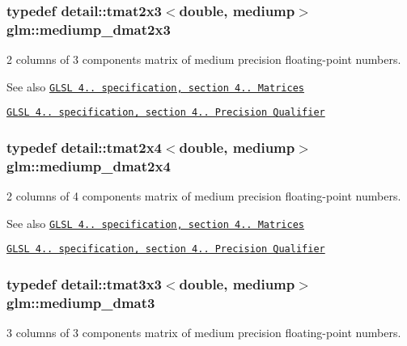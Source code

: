 \subsubsection[{\texorpdfstring{mediump\+\_\+dmat2x3}{mediump_dmat2x3}}]{\setlength{\rightskip}{0pt plus 5cm}typedef detail\+::tmat2x3$<$double, mediump$>$ {\bf glm\+::mediump\+\_\+dmat2x3}}\hypertarget{group__core__precision_ga734e988edf759c7012c443014acb6674}{}\label{group__core__precision_ga734e988edf759c7012c443014acb6674}
2 columns of 3 components matrix of medium precision floating-\/point numbers.

\begin{DoxySeeAlso}{See also}
\href{http://www.opengl.org/registry/doc/GLSLangSpec.4.20.8.pdf}{\tt G\+L\+SL 4.. specification, section 4.. Matrices} 

\href{http://www.opengl.org/registry/doc/GLSLangSpec.4.20.8.pdf}{\tt G\+L\+SL 4.. specification, section 4.. Precision Qualifier} 
\end{DoxySeeAlso}
\subsubsection[{\texorpdfstring{mediump\+\_\+dmat2x4}{mediump_dmat2x4}}]{\setlength{\rightskip}{0pt plus 5cm}typedef detail\+::tmat2x4$<$double, mediump$>$ {\bf glm\+::mediump\+\_\+dmat2x4}}\hypertarget{group__core__precision_gadb60bf60ef2b8da4a28a372b2bcca3a3}{}\label{group__core__precision_gadb60bf60ef2b8da4a28a372b2bcca3a3}
2 columns of 4 components matrix of medium precision floating-\/point numbers.

\begin{DoxySeeAlso}{See also}
\href{http://www.opengl.org/registry/doc/GLSLangSpec.4.20.8.pdf}{\tt G\+L\+SL 4.. specification, section 4.. Matrices} 

\href{http://www.opengl.org/registry/doc/GLSLangSpec.4.20.8.pdf}{\tt G\+L\+SL 4.. specification, section 4.. Precision Qualifier} 
\end{DoxySeeAlso}
\subsubsection[{\texorpdfstring{mediump\+\_\+dmat3}{mediump_dmat3}}]{\setlength{\rightskip}{0pt plus 5cm}typedef detail\+::tmat3x3$<$double, mediump$>$ {\bf glm\+::mediump\+\_\+dmat3}}\hypertarget{group__core__precision_ga80600af2c1ca11ead6123777185c372d}{}\label{group__core__precision_ga80600af2c1ca11ead6123777185c372d}
3 columns of 3 components matrix of medium precision floating-\/point numbers.

